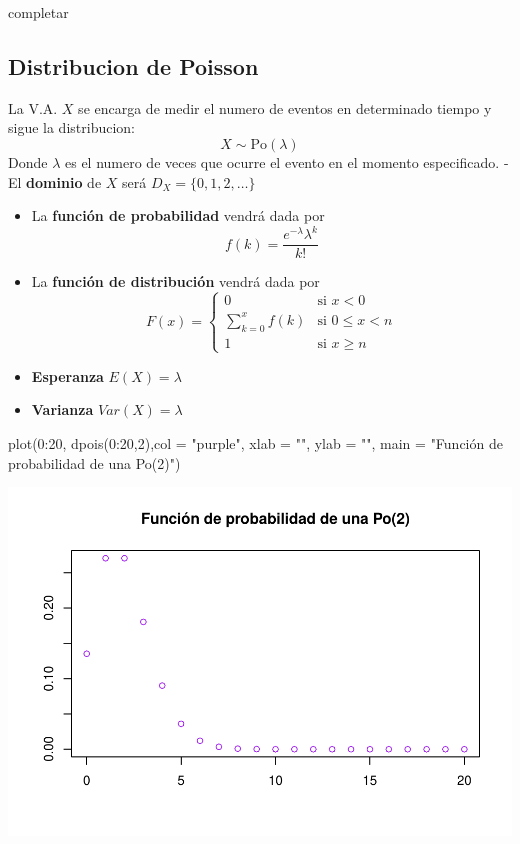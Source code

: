 \documentclass[
]{article}
\newenvironment{Shaded}{\begin{snugshade}}{\end{snugshade}}
\newcommand{\AttributeTok}[1]{\textcolor[rgb]{0.77,0.63,0.00}{#1}}
\newcommand{\DecValTok}[1]{\textcolor[rgb]{0.00,0.00,0.81}{#1}}
\newcommand{\FunctionTok}[1]{\textcolor[rgb]{0.00,0.00,0.00}{#1}}
\newcommand{\NormalTok}[1]{#1}
\newcommand{\SpecialCharTok}[1]{\textcolor[rgb]{0.00,0.00,0.00}{#1}}
\newcommand{\StringTok}[1]{\textcolor[rgb]{0.31,0.60,0.02}{#1}}
\begin{document}
completar

\hypertarget{distribucion-de-poisson}{%
\subsection{Distribucion de Poisson}\label{distribucion-de-poisson}}

La V.A. \(X\) se encarga de medir el numero de eventos en determinado
tiempo y sigue la distribucion: \[X\sim \text{Po}(\lambda)\] Donde
\(\lambda\) es el numero de veces que ocurre el evento en el momento
especificado. - El \textbf{dominio} de \(X\) será
\(D_X = \{0,1,2,\dots\}\)

\begin{itemize}
\item
  La \textbf{función de probabilidad} vendrá dada por
  \[f(k) = \frac{e^{-\lambda}\lambda^k}{k!}\]
\item
  La \textbf{función de distribución} vendrá dada por \[F(x) = \left\{
  \begin{array}{cl}
     0 & \text{si } x<0 
  \\ \sum_{k=0}^xf(k) & \text{si } 0\le x<n
  \\ 1 & \text{si } x\ge n
  \end{array}
  \right.\]
\item
  \textbf{Esperanza} \(E(X) = \lambda\)
\item
  \textbf{Varianza} \(Var(X) = \lambda\)
\end{itemize}

\begin{Shaded}
\begin{Highlighting}[]
\FunctionTok{plot}\NormalTok{(}\DecValTok{0}\SpecialCharTok{:}\DecValTok{20}\NormalTok{, }\FunctionTok{dpois}\NormalTok{(}\DecValTok{0}\SpecialCharTok{:}\DecValTok{20}\NormalTok{,}\DecValTok{2}\NormalTok{),}\AttributeTok{col =} \StringTok{"purple"}\NormalTok{, }\AttributeTok{xlab =} \StringTok{""}\NormalTok{, }\AttributeTok{ylab =} \StringTok{""}\NormalTok{, }\AttributeTok{main =} \StringTok{"Función de probabilidad de una Po(2)"}\NormalTok{)}
\end{Highlighting}
\end{Shaded}

\includegraphics{Teoria4_files/figure-latex/Distribucion de Poisson-1.pdf}
\end{document}
